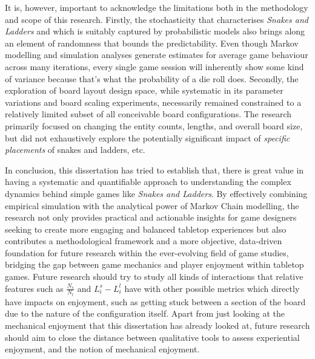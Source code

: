 It is, however, important to acknowledge the limitations both in the methodology and scope of this research. Firstly, the stochasticity that characterises \textit{Snakes and Ladders} and which is suitably captured by probabilistic models also brings along an element of randomness that bounds the predictability. Even though Markov modelling and simulation analyses generate estimates for average game behaviour across many iterations, every single game session will inherently show some kind of variance because that's what the probability of a die roll does.  Secondly, the exploration of board layout design space, while systematic in its parameter variations and board scaling experiments, necessarily remained constrained to a relatively limited subset of all conceivable board configurations.  The research primarily focused on changing the entity counts, lengths, and overall board size, but did not exhaustively explore the potentially significant impact of \textit{specific placements} of snakes and ladders, etc. 

In conclusion, this dissertation has tried to establish that, there is great value in having a systematic and quantifiable approach to understanding the complex dynamics behind simple games like \textit{Snakes and Ladders}. By effectively combining empirical simulation with the analytical power of Markov Chain modelling, the research not only provides practical and actionable insights for game designers seeking to create more engaging and balanced tabletop experiences but also contributes a methodological framework and a more objective, data-driven foundation for future research within the ever-evolving field of game studies, bridging the gap between game mechanics and player enjoyment within tabletop games. Future research should try to study all kinds of interactions that relative features such as $\frac{N_s}{N_l}$ and $L^s_i-L^l_i$ have with other possible metrics which directly have impacts on enjoyment, such as getting stuck between a section of the board due to the nature of the configuration itself. Apart from just looking at the mechanical enjoyment that this dissertation has already looked at, future research should aim to close the distance between qualitative tools to assess experiential enjoyment, and the notion of mechanical enjoyment.
